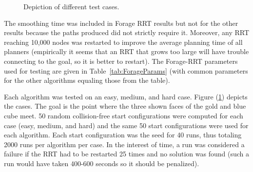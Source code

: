 \documentclass[conference]{IEEEtran}
\begin{document}
\begin{figure}[t]
  \centering
  \caption{Depiction of different test cases.}
  \label{fig:cases}
\end{figure}

The smoothing time was included in Forage RRT results but not for the other 
results because the paths produced did not strictly require it. Moreover,
any RRT reaching 10,000 nodes was restarted to improve the average planning
time of all planners (empirically it seems that an RRT that grows too large
will have trouble connecting to the goal, so it is better to restart).
The Forage-RRT parameters used for testing are given in
Table~\ref{tab:ForageParams} (with common parameters for the other
algorithms equaling those from the table).

Each algorithm was tested on an easy, medium, and hard case. Figure 
(\ref{fig:cases}) depicts the cases.  The goal is the point where the three 
shown faces of the gold and blue cube meet. 50 random collision-free start 
configurations were computed for each case (easy, medium, and hard) and the 
same 50 start configurations were used for each algorithm. Each start 
configuration was the seed for 40 runs, thus totaling 2000 runs per
algorithm per case. In the interest of time, a run was considered a failure
if the RRT had to be restarted 25 times and no solution was found (such
a run would have taken 400-600 seconds so it should be penalized). 
\end{document}
